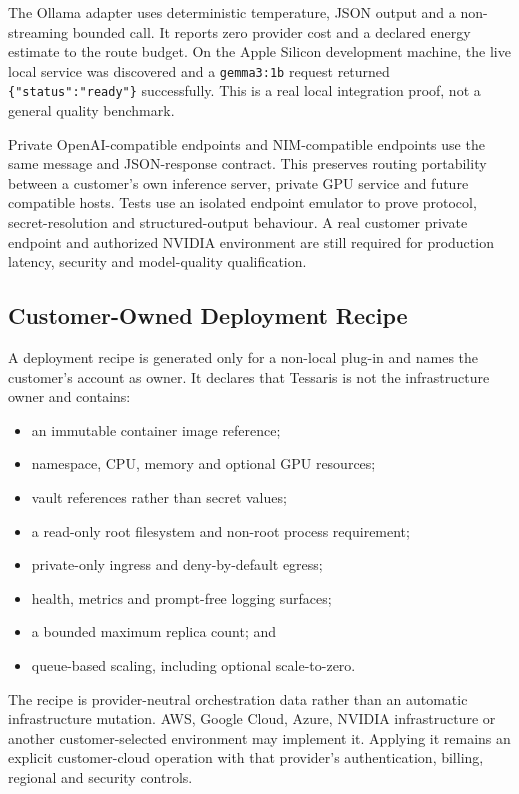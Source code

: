 The Ollama adapter uses deterministic temperature, JSON output and a non-streaming bounded
call.  It reports zero provider cost and a declared energy estimate to the route budget.
On the Apple Silicon development machine, the live local service was discovered and a
\texttt{gemma3:1b} request returned \texttt{\{"status":"ready"\}} successfully.  This is
a real local integration proof, not a general quality benchmark.

Private OpenAI-compatible endpoints and NIM-compatible endpoints use the same message and
JSON-response contract.  This preserves routing portability between a customer's own
inference server, private GPU service and future compatible hosts.  Tests use an isolated
endpoint emulator to prove protocol, secret-resolution and structured-output behaviour.
A real customer private endpoint and authorized NVIDIA environment are still required for
production latency, security and model-quality qualification.

\subsection{Customer-Owned Deployment Recipe}

A deployment recipe is generated only for a non-local plug-in and names the customer's
account as owner.  It declares that Tessaris is not the infrastructure owner and contains:
\begin{itemize}
  \item an immutable container image reference;
  \item namespace, CPU, memory and optional GPU resources;
  \item vault references rather than secret values;
  \item a read-only root filesystem and non-root process requirement;
  \item private-only ingress and deny-by-default egress;
  \item health, metrics and prompt-free logging surfaces;
  \item a bounded maximum replica count; and
  \item queue-based scaling, including optional scale-to-zero.
\end{itemize}

The recipe is provider-neutral orchestration data rather than an automatic infrastructure
mutation.  AWS, Google Cloud, Azure, NVIDIA infrastructure or another customer-selected
environment may implement it.  Applying it remains an explicit customer-cloud operation
with that provider's authentication, billing, regional and security controls.

